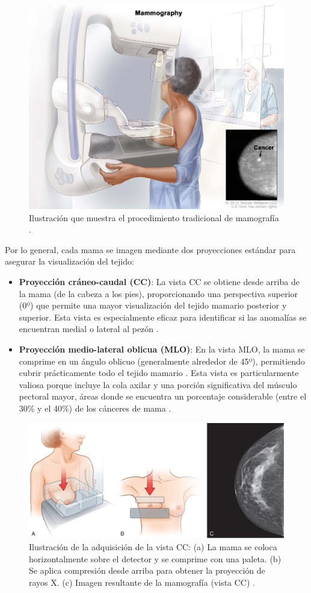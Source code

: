 \documentclass[a4paper,10pt]{book}
\begin{document}
\begin{figure}[h!]
    \centering
    \includegraphics[width=0.45\linewidth]{reports//assets/mammography.jpg}
    \caption[Procedimiento tradicional de mamografía]{Ilustración que muestra el procedimiento tradicional de mamografía \cite{nihDefinitionMammogramNCI2011}.}
    \label{fig:mammography}
\end{figure}

Por lo general, cada mama se imagen mediante dos proyecciones estándar para asegurar la visualización del tejido:

\begin{itemize}
    \item \textbf{Proyección cráneo-caudal (CC)}: La vista CC se obtiene desde arriba de la mama (de la cabeza a los pies), proporcionando una perspectiva superior (0º) que permite una mayor visualización del tejido mamario posterior y superior. Esta vista es especialmente eficaz para identificar si las anomalías se encuentran medial o lateral al pezón \cite{noauthor_guide_nodate}.
    \item \textbf{Proyección medio-lateral oblicua (MLO)}: En la vista MLO, la mama se comprime en un ángulo oblicuo (generalmente alrededor de 45º), permitiendo cubrir prácticamente todo el tejido mamario \cite{noauthor_guide_nodate}. Esta vista es particularmente valiosa porque incluye la cola axilar y una porción significativa del músculo pectoral mayor, áreas donde se encuentra un porcentaje considerable (entre el 30\% y el 40\%) de los cánceres de mama \cite{aljarrah_trends_2014, noauthor_breast_2015}.
\end{itemize}

\begin{figure}[h!]
    \centering
    \includegraphics[width=0.6\linewidth]{reports//assets/cc_view.jpg}
    \caption[Procedimiento de adquisición de la vista CC]{Ilustración de la adquisición de la vista CC: (a) La mama se coloca horizontalmente sobre el detector y se comprime con una paleta. (b) Se aplica compresión desde arriba para obtener la proyección de rayos X. (c) Imagen resultante de la mamografía (vista CC) \cite{imaging_introduction_2022}. }
    \label{fig:cc_view}
\end{figure}
\end{document}
